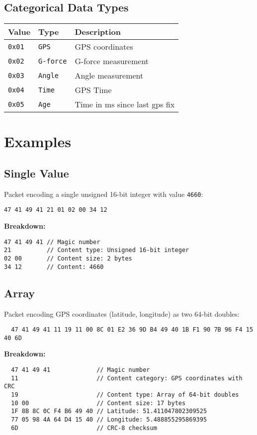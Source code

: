 \documentclass[a4paper]{article}
\begin{document}
\subsection*{Categorical Data Types}
\begin{longtable}{@{}lll@{}}
\toprule
Value    & Type             & Description                  \\
\midrule
\texttt{0x01} & \texttt{GPS}        & GPS coordinates              \\
\texttt{0x02} & \texttt{G-force}    & G-force measurement          \\
\texttt{0x03} & \texttt{Angle}      & Angle measurement            \\
\texttt{0x04} & \texttt{Time}       & GPS Time                     \\
\texttt{0x05} & \texttt{Age}        & Time in ms since last gps fix\\
\bottomrule
\end{longtable}

\section*{Examples}
\subsection*{Single Value}
Packet encoding a single unsigned 16-bit integer with value \texttt{4660}:
\begin{verbatim}
47 41 49 41 21 01 02 00 34 12
\end{verbatim}
\textbf{Breakdown:}
\begin{verbatim}
47 41 49 41 // Magic number
21          // Content type: Unsigned 16-bit integer
02 00       // Content size: 2 bytes
34 12       // Content: 4660
\end{verbatim}

\subsection*{Array}
Packet encoding GPS coordinates (latitude, longitude) as two 64-bit doubles:
\begin{verbatim}
  47 41 49 41 11 19 11 00 8C 01 E2 36 9D B4 49 40 1B F1 90 7B 96 F4 15 40 6D
\end{verbatim}
\textbf{Breakdown:}
\begin{verbatim}
  47 41 49 41             // Magic number
  11                      // Content category: GPS coordinates with CRC
  19                      // Content type: Array of 64-bit doubles
  10 00                   // Content size: 17 bytes
  1F 8B 8C 0C F4 B6 49 40 // Latitude: 51.411047802309525
  77 05 98 4A 64 D4 15 40 // Longitude: 5.488855295869395
  6D                      // CRC-8 checksum
\end{verbatim}
\end{document}
